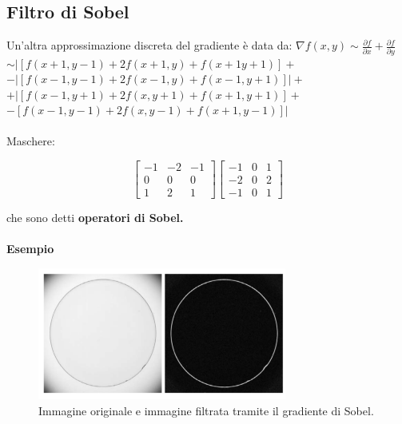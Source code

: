 \subsection{Filtro di Sobel}
Un'altra approssimazione discreta del gradiente è data da:
$\nabla f(x,y) \sim \frac{\partial{f}}{\partial{x}} + \frac{\partial{f}}{\partial{y}}$
\\$\sim  |[f(x+1,y-1) + 2f(x+1,y) + f(x+1 y+1)]+$
    \\$ - |[f(x-1, y-1)+2f(x-1,y) + f(x-1, y+1)]|+$
\\$ + |[f(x-1, y+1) + 2f(x,y+1)+f(x+1,y+1)]+$
    \\$ - [f(x-1,y -1) + 2f(x,y-1) + f(x+1,y-1)]|$
\\\\Maschere:

\begin{center}
    \[
        \begin{bmatrix}
            -1 & -2 & -1 \\
            0  & 0  & 0  \\
            1  & 2  & 1
        \end{bmatrix}
        \begin{bmatrix}
            -1 & 0 & 1 \\
            -2 & 0 & 2 \\
            -1 & 0 & 1
        \end{bmatrix}
    \]
\end{center}

che sono detti \textbf{operatori di Sobel.}
\\\\
\textbf{Esempio}

\begin{figure}[H]
    \centering
    \includegraphics[width=\linewidth, keepaspectratio]{capitoli/immagini/imgs/sobel.png}
    \caption*{Immagine originale e immagine filtrata tramite il gradiente di Sobel.}
\end{figure}

